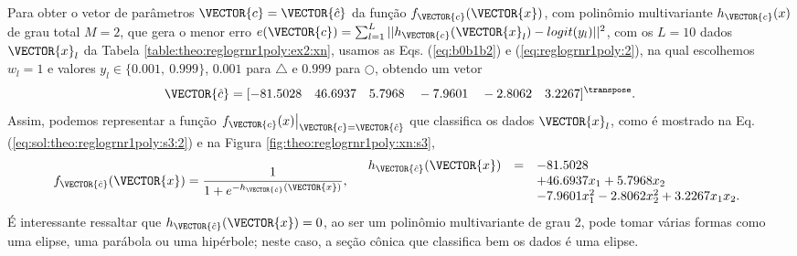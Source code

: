 \begin{SolutionT}\label{sol:theo:reglogrnr1poly:s3}
Para obter o vetor de parâmetros $\VECTOR{c}=\VECTOR{\hat{c}}$ da função $f_{\VECTOR{c}}(\VECTOR{x})$, 
com polinômio multivariante $h_{\VECTOR{c}}(x)$ de grau total $M=2$,
que gera o menor erro $e(\VECTOR{c}) =  \sum_{l=1}^{L} ||h_{\VECTOR{c}}(\VECTOR{x}_l)-logit(y_l)||^2$,
com os $L=10$ dados $\VECTOR{x}_l$ da Tabela \ref{table:theo:reglogrnr1poly:ex2:xn},
usamos as Eqs. (\ref{eq:b0b1b2}) e  (\ref{eq:reglogrnr1poly:2}), 
na qual escolhemos $w_l=1$ e valores $y_l \in \{0.001,~ 0.999\}$,
$0.001$ para $\bigtriangleup$ e $0.999$ para $\bigcirc$, 
obtendo um vetor 
\begin{equation}
\VECTOR{\hat{c}}=[-81.5028\quad 46.6937\quad 5.7968\quad -7.9601\quad -2.8062\quad 3.2267]^{\transpose}.             
\end{equation}
Assim, podemos representar a função $\left.f_{\VECTOR{c}}(x)\right|_{\VECTOR{c}=\VECTOR{\hat{c}}}$
 que classifica os dados $\VECTOR{x}_l$, 
como é mostrado na Eq. (\ref{eq:sol:theo:reglogrnr1poly:s3:2}) e na Figura \ref{fig:theo:reglogrnr1poly:xn:s3},
\begin{equation}\label{eq:sol:theo:reglogrnr1poly:s3:2}
f_{\VECTOR{\hat{c}}}(\VECTOR{x})= \frac{1}{1+e^{-h_{\VECTOR{\hat{c}}}(\VECTOR{x})}},
\quad
\begin{array}{lll}
h_{\VECTOR{\hat{c}}}(\VECTOR{x}) & = & -81.5028\\
                         ~ & ~ & +46.6937 x_1 +5.7968 x_2 \\
                         ~ & ~ & -7.9601 x_1^2 -2.8062  x_2^2 + 3.2267 x_1 x_2.
\end{array}
\end{equation}
É interessante ressaltar que $h_{\VECTOR{\hat{c}}}(\VECTOR{x})=0$, 
ao ser um polinômio multivariante de grau 2,
pode tomar várias formas como uma elipse, uma parábola ou uma hipérbole;
neste caso, a seção cônica que classifica bem os dados é uma elipse.
\end{SolutionT}
